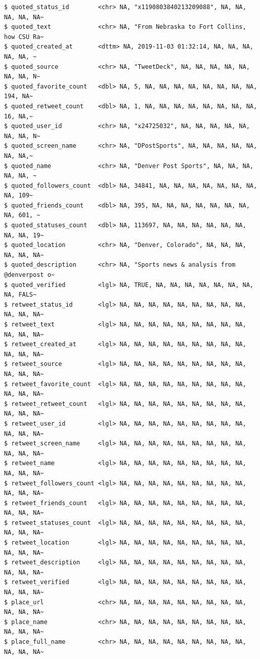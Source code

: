 \documentclass[
  letterpaper,
  DIV=11,
  numbers=noendperiod]{scrreprt}
\begin{document}
\begin{verbatim}
$ quoted_status_id        <chr> NA, "x1190803840213209088", NA, NA, NA, NA, NA~
$ quoted_text             <chr> NA, "From Nebraska to Fort Collins, how CSU Ra~
$ quoted_created_at       <dttm> NA, 2019-11-03 01:32:14, NA, NA, NA, NA, NA, ~
$ quoted_source           <chr> NA, "TweetDeck", NA, NA, NA, NA, NA, NA, NA, N~
$ quoted_favorite_count   <dbl> NA, 5, NA, NA, NA, NA, NA, NA, NA, NA, 194, NA~
$ quoted_retweet_count    <dbl> NA, 1, NA, NA, NA, NA, NA, NA, NA, NA, 16, NA,~
$ quoted_user_id          <chr> NA, "x24725032", NA, NA, NA, NA, NA, NA, NA, N~
$ quoted_screen_name      <chr> NA, "DPostSports", NA, NA, NA, NA, NA, NA, NA,~
$ quoted_name             <chr> NA, "Denver Post Sports", NA, NA, NA, NA, NA, ~
$ quoted_followers_count  <dbl> NA, 34841, NA, NA, NA, NA, NA, NA, NA, NA, 109~
$ quoted_friends_count    <dbl> NA, 395, NA, NA, NA, NA, NA, NA, NA, NA, 601, ~
$ quoted_statuses_count   <dbl> NA, 113697, NA, NA, NA, NA, NA, NA, NA, NA, 19~
$ quoted_location         <chr> NA, "Denver, Colorado", NA, NA, NA, NA, NA, NA~
$ quoted_description      <chr> NA, "Sports news & analysis from @denverpost o~
$ quoted_verified         <lgl> NA, TRUE, NA, NA, NA, NA, NA, NA, NA, NA, FALS~
$ retweet_status_id       <lgl> NA, NA, NA, NA, NA, NA, NA, NA, NA, NA, NA, NA~
$ retweet_text            <lgl> NA, NA, NA, NA, NA, NA, NA, NA, NA, NA, NA, NA~
$ retweet_created_at      <lgl> NA, NA, NA, NA, NA, NA, NA, NA, NA, NA, NA, NA~
$ retweet_source          <lgl> NA, NA, NA, NA, NA, NA, NA, NA, NA, NA, NA, NA~
$ retweet_favorite_count  <lgl> NA, NA, NA, NA, NA, NA, NA, NA, NA, NA, NA, NA~
$ retweet_retweet_count   <lgl> NA, NA, NA, NA, NA, NA, NA, NA, NA, NA, NA, NA~
$ retweet_user_id         <lgl> NA, NA, NA, NA, NA, NA, NA, NA, NA, NA, NA, NA~
$ retweet_screen_name     <lgl> NA, NA, NA, NA, NA, NA, NA, NA, NA, NA, NA, NA~
$ retweet_name            <lgl> NA, NA, NA, NA, NA, NA, NA, NA, NA, NA, NA, NA~
$ retweet_followers_count <lgl> NA, NA, NA, NA, NA, NA, NA, NA, NA, NA, NA, NA~
$ retweet_friends_count   <lgl> NA, NA, NA, NA, NA, NA, NA, NA, NA, NA, NA, NA~
$ retweet_statuses_count  <lgl> NA, NA, NA, NA, NA, NA, NA, NA, NA, NA, NA, NA~
$ retweet_location        <lgl> NA, NA, NA, NA, NA, NA, NA, NA, NA, NA, NA, NA~
$ retweet_description     <lgl> NA, NA, NA, NA, NA, NA, NA, NA, NA, NA, NA, NA~
$ retweet_verified        <lgl> NA, NA, NA, NA, NA, NA, NA, NA, NA, NA, NA, NA~
$ place_url               <chr> NA, NA, NA, NA, NA, NA, NA, NA, NA, NA, NA, NA~
$ place_name              <chr> NA, NA, NA, NA, NA, NA, NA, NA, NA, NA, NA, NA~
$ place_full_name         <chr> NA, NA, NA, NA, NA, NA, NA, NA, NA, NA, NA, NA~

\end{verbatim}
\end{document}
